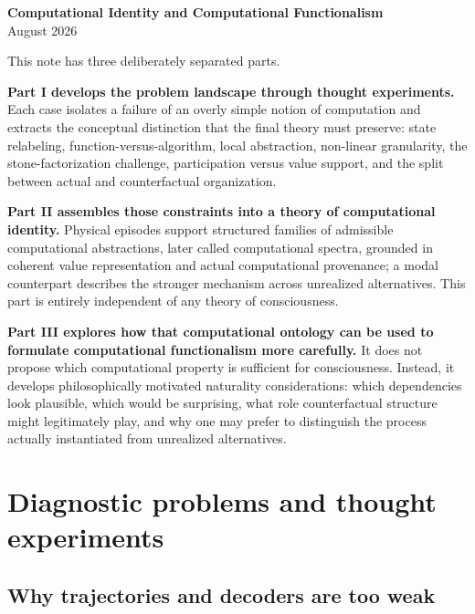 \documentclass[11pt,a4paper]{article}
\newcounter{thought}
\begin{document}
\begin{center}
{\LARGE\bfseries\color{navy} Computational Identity and Computational Functionalism}\\[3mm]
{\small August 2026}
\end{center}

\begin{thesisbox}[title={What this note does}]
This note has three deliberately separated parts.

\textbf{Part I develops the problem landscape through thought experiments.} Each case isolates a failure of an overly simple notion of computation and extracts the conceptual distinction that the final theory must preserve: state relabeling, function-versus-algorithm, local abstraction, non-linear granularity, the stone-factorization challenge, participation versus value support, and the split between actual and counterfactual organization.

\textbf{Part II assembles those constraints into a theory of computational identity.} Physical episodes support structured families of admissible computational abstractions, later called computational spectra, grounded in coherent value representation and actual computational provenance; a modal counterpart describes the stronger mechanism across unrealized alternatives. This part is entirely independent of any theory of consciousness.

\textbf{Part III explores how that computational ontology can be used to formulate computational functionalism more carefully.} It does not propose which computational property is sufficient for consciousness. Instead, it develops philosophically motivated naturality considerations: which dependencies look plausible, which would be surprising, what role counterfactual structure might legitimately play, and why one may prefer to distinguish the process actually instantiated from unrealized alternatives.
\end{thesisbox}

\section{Diagnostic problems and thought experiments}

\subsection{Why trajectories and decoders are too weak}
\end{document}
